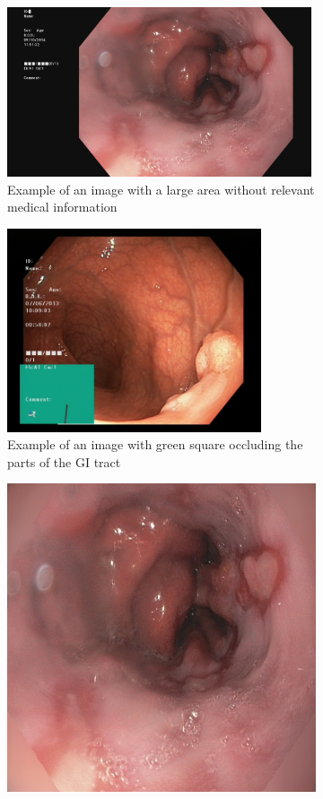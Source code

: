 \begin{figure}
     \centering
     \begin{subfigure}[b]{0.4\textwidth}
         \centering
         \includegraphics[height=5cm,width=\textwidth]{experiments/figures/leftframe.jpg}
         \caption{Example of an image with a large area without relevant medical information}
         \label{fig:LargeLeftBlack}
     \end{subfigure}
     \hfill
     \begin{subfigure}[b]{0.4\textwidth}
         \centering
         \includegraphics[height=6cm,width=\textwidth]{experiments/figures/greenframe.jpg}
         \caption{Example of an image with green square occluding the parts of the GI tract}
         \label{fig:GreenSquareOccluding}
     \end{subfigure}     
     \hfill
     \begin{subfigure}[b]{0.4\textwidth}
         \centering
         \includegraphics[width=\textwidth]{experiments/figures/noleftframe.jpg}

\end{subfigure}
\end{figure}

